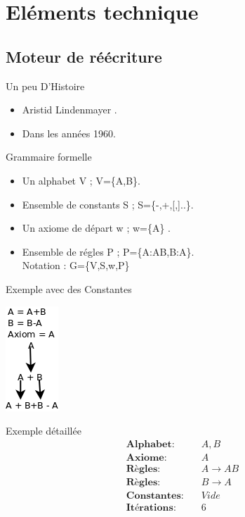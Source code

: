 \section{Eléments technique }


\subsection{Moteur de réécriture}
    \begin{frame}{Un peu D'Histoire}
    \begin{itemize}
          \item Aristid Lindenmayer .
          \item Dans les années 1960. 
    \end{itemize}
   
\end{frame}
\begin{frame}{Grammaire formelle}
\begin{itemize}
    \item Un alphabet V ;  V=\{A,B\}.
    \item Ensemble de constants S ; S=\{-,+,[,]..\}. 
     
    \item Un axiome de départ w ; w=\{A\} .
    \item Ensemble de régles P ; P=\{A:AB,B:A\}.\\
    Notation : G=\{V,S,w,P\}
\end{itemize}   
\end{frame}
\begin{frame}{Exemple avec des Constantes}
     \vspace{1cm}
    \begin{center}
        \includegraphics[scale=0.4]{./images/reecriture.png}
    \end{center}
\end{frame}
\begin{frame}{Exemple détaillée}
        \begin{align*}
    \textbf{Alphabet:} & \quad A, B\\
    \textbf{Axiome:} & \quad A \\
    \textbf{Règles:} & \quad A \rightarrow AB \\
    \textbf{Règles:} & \quad B \rightarrow A \\
    \textbf{Constantes:} & \quad Vide \\
    \textbf{Itérations:} & \quad 6
    \end{align*}
 
	   
\end{frame}

